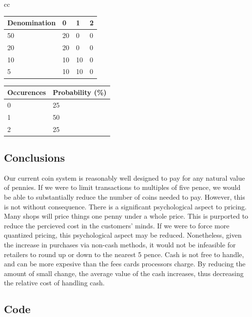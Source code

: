 \documentclass{article}
\begin{document}
\begin{tabular}{cc}
    \begin{tabular}[t]{llll}
        Denomination & 0  & 1  & 2 \\
        \hline
        50           & 20 & 0  & 0 \\
        20           & 20 & 0  & 0 \\
        10           & 10 & 10 & 0 \\
        5            & 10 & 10 & 0 \\
        \hline
    \end{tabular}
    \: \: \:
    \begin{tabular}[t]{ll}
        Occurences & Probability (\%) \\
        \hline
        0          & 25               \\
        1          & 50               \\
        2          & 25               \\
        \hline
    \end{tabular}
\end{tabular}

\subsection{Conclusions}
Our current coin system is reasonably well designed to pay for any natural value of pennies.
If we were to limit transactions to multiples of five pence, we would be able to substantially reduce the number of coins needed to pay.
However, this is not without consequence.
There is a significant psychological aspect to pricing.
Many shops will price things one penny under a whole price.
This is purported to reduce the percieved cost in the customers' minds.
If we were to force more quantized pricing, this psychological aspect may be reduced.
Nonetheless, given the increase in purchases via non-cash methods, it would not be infeasible for retailers to round up or down to the nearest 5 pence.
Cash is not free to handle, and can be more expesive than the fees cards processors charge.
By reducing the amount of small change, the average value of the cash increases, thus decreasing the relative cost of handling cash.
\newpage
\subsection{Code}
\end{document}
